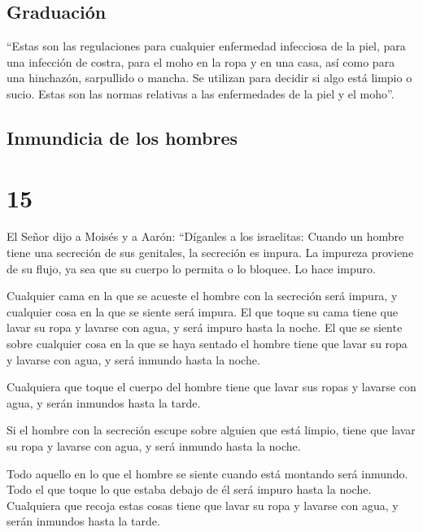 \hypertarget{graduaciuxf3n}{%
\subsection{Graduación}\label{graduaciuxf3n}}

 ``Estas son las regulaciones para cualquier enfermedad
infecciosa de la piel, para una infección de costra, 
para el moho en la ropa y en una casa,  así como para una
hinchazón, sarpullido o mancha.  Se utilizan para decidir
si algo está limpio o sucio. Estas son las normas relativas a las
enfermedades de la piel y el moho''.

\hypertarget{inmundicia-de-los-hombres}{%
\subsection{Inmundicia de los hombres}\label{inmundicia-de-los-hombres}}

\hypertarget{section-14}{%
\section{15}\label{section-14}}

 El Señor dijo a Moisés y a Aarón: 
``Díganles a los israelitas: Cuando un hombre tiene una secreción de sus
genitales, la secreción es impura.  La impureza proviene
de su flujo, ya sea que su cuerpo lo permita o lo bloquee. Lo hace
impuro.

 Cualquier cama en la que se acueste el hombre con la
secreción será impura, y cualquier cosa en la que se siente será impura.
 El que toque su cama tiene que lavar su ropa y lavarse
con agua, y será impuro hasta la noche.  El que se siente
sobre cualquier cosa en la que se haya sentado el hombre tiene que lavar
su ropa y lavarse con agua, y será inmundo hasta la noche.

 Cualquiera que toque el cuerpo del hombre tiene que lavar
sus ropas y lavarse con agua, y serán inmundos hasta la tarde.

 Si el hombre con la secreción escupe sobre alguien que
está limpio, tiene que lavar su ropa y lavarse con agua, y será inmundo
hasta la noche.

 Todo aquello en lo que el hombre se siente cuando está
montando será inmundo.  Todo el que toque lo que estaba
debajo de él será impuro hasta la noche. Cualquiera que recoja estas
cosas tiene que lavar su ropa y lavarse con agua, y serán inmundos hasta
la tarde.

